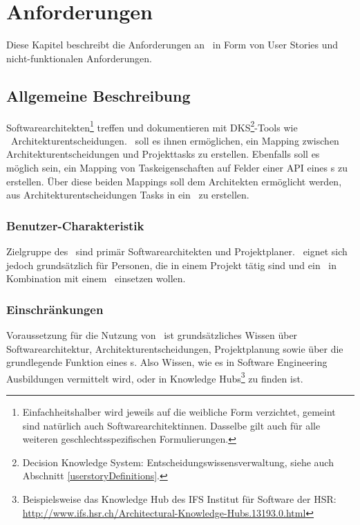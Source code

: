 \chapter{Anforderungen}

Diese Kapitel beschreibt die Anforderungen an \eeppi\ in Form von User Stories und nicht-funktionalen Anforderungen.

\section{Allgemeine Beschreibung}

Softwarearchitekten\footnote{Einfachheitshalber wird jeweils auf die weibliche Form verzichtet, gemeint sind natürlich auch Softwarearchitektinnen. Dasselbe gilt auch für alle weiteren geschlechtsspezifischen Formulierungen.} treffen und dokumentieren mit DKS\footnote{Decision Knowledge System: Entscheidungswissensverwaltung, siehe auch Abschnitt \ref{userstoryDefinitions}.}-Tools wie \cdar\ Architekturentscheidungen.
\eeppi\ soll es ihnen ermöglichen, ein Mapping zwischen Architekturentscheidungen und Projekttasks zu erstellen.
Ebenfalls soll es möglich sein, ein Mapping von Taskeigenschaften auf Felder einer API eines \ppt s zu erstellen.
Über diese beiden Mappings soll dem Architekten ermöglicht werden, aus Architekturentscheidungen Tasks in ein \ppt\ zu erstellen.

\subsection{Benutzer-Charakteristik}
Zielgruppe des \eeppi\ sind primär Softwarearchitekten und Projektplaner. \eeppi\ eignet sich jedoch grundsätzlich für Personen, die in einem Projekt tätig sind und ein \dks\ in Kombination mit einem \ppt\ einsetzen wollen.

\subsection{Einschränkungen}
Voraussetzung für die Nutzung von \eeppi\ ist grundsätzliches Wissen über Softwarearchitektur, Architekturentscheidungen, Projektplanung sowie über die grundlegende Funktion eines \ppt s.
Also Wissen, wie es in Software Engineering Ausbildungen vermittelt wird,
oder in Knowledge Hubs\footnote{Beispielsweise das Knowledge Hub des IFS Institut für Software der HSR: \url{http://www.ifs.hsr.ch/Architectural-Knowledge-Hubs.13193.0.html}} zu finden ist.